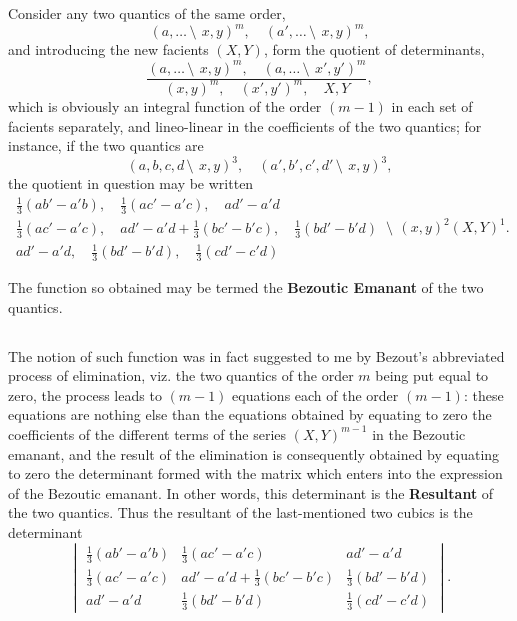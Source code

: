 \documentclass[12pt,a4paper]{article}
\begin{document}
\subsection{}

Consider any two quantics of the same order,
\[
(a, \ldots \,\setminus\!\!\:\, x, y)^m, \quad (a', \ldots \,\setminus\!\!\:\, x, y)^m,
\]
and introducing the new facients $(X, Y)$, form the quotient of determinants,
\[
\frac{(a, \ldots \,\setminus\!\!\:\, x, y)^m, \quad (a, \ldots \,\setminus\!\!\:\, x', y')^m}{(x, y)^m, \quad (x', y')^m, \quad X, Y},
\]
which is obviously an integral function of the order $(m - 1)$ in each set of facients separately, and lineo-linear in the coefficients of the two quantics; for instance, if the two quantics are
\[
(a, b, c, d\,\setminus\!\!\:\, x, y)^3, \quad (a', b', c', d'\,\setminus\!\!\:\, x, y)^3,
\]
the quotient in question may be written
\[
\begin{array}{c}
\frac{1}{3}(ab' - a'b), \quad \frac{1}{3}(ac' - a'c), \quad ad' - a'd \\
\frac{1}{3}(ac' - a'c), \quad ad' - a'd + \frac{1}{3}(bc' - b'c), \quad \frac{1}{3}(bd' - b'd) \\
ad' - a'd, \quad \frac{1}{3}(bd' - b'd), \quad \frac{1}{3}(cd' - c'd)
\end{array}
\,\setminus\!\!\:\, (x, y)^2(X, Y)^1.
\]

The function so obtained may be termed the \textbf{Bezoutic Emanant} of the two quantics.

\subsection{}

The notion of such function was in fact suggested to me by Bezout's abbreviated process of elimination, viz. the two quantics of the order $m$ being put equal to zero, the process leads to $(m - 1)$ equations each of the order $(m - 1)$: these equations are nothing else than the equations obtained by equating to zero the coefficients of the different terms of the series $(X, Y)^{m-1}$ in the Bezoutic emanant, and the result of the elimination is consequently obtained by equating to zero the determinant formed with the matrix which enters into the expression of the Bezoutic emanant. In other words, this determinant is the \textbf{Resultant} of the two quantics. Thus the resultant of the last-mentioned two cubics is the determinant
\[
\begin{vmatrix}
\frac{1}{3}(ab' - a'b) & \frac{1}{3}(ac' - a'c) & ad' - a'd \\
\frac{1}{3}(ac' - a'c) & ad' - a'd + \frac{1}{3}(bc' - b'c) & \frac{1}{3}(bd' - b'd) \\
ad' - a'd & \frac{1}{3}(bd' - b'd) & \frac{1}{3}(cd' - c'd)
\end{vmatrix}.
\]
\end{document}
